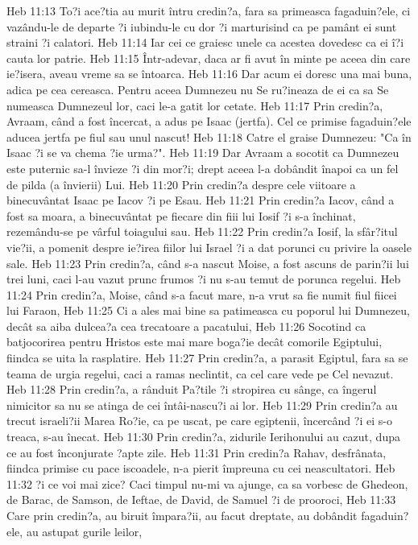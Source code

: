 Heb 11:13  To?i ace?tia au murit întru credin?a, fara sa primeasca fagaduin?ele, ci vazându-le de departe ?i iubindu-le cu dor ?i marturisind ca pe pamânt ei sunt straini ?i calatori.
Heb 11:14  Iar cei ce graiesc unele ca acestea dovedesc ca ei î?i cauta lor patrie.
Heb 11:15  Într-adevar, daca ar fi avut în minte pe aceea din care ie?isera, aveau vreme sa se întoarca.
Heb 11:16  Dar acum ei doresc una mai buna, adica pe cea cereasca. Pentru aceea Dumnezeu nu Se ru?ineaza de ei ca sa Se numeasca Dumnezeul lor, caci le-a gatit lor cetate.
Heb 11:17  Prin credin?a, Avraam, când a fost încercat, a adus pe Isaac (jertfa). Cel ce primise fagaduin?ele aducea jertfa pe fiul sau unul nascut!
Heb 11:18  Catre el graise Dumnezeu: "Ca în Isaac ?i se va chema ?ie urma?".
Heb 11:19  Dar Avraam a socotit ca Dumnezeu este puternic sa-l învieze ?i din mor?i; drept aceea l-a dobândit înapoi ca un fel de pilda (a învierii) Lui.
Heb 11:20  Prin credin?a despre cele viitoare a binecuvântat Isaac pe Iacov ?i pe Esau.
Heb 11:21  Prin credin?a Iacov, când a fost sa moara, a binecuvântat pe fiecare din fiii lui Iosif ?i s-a închinat, rezemându-se pe vârful toiagului sau.
Heb 11:22  Prin credin?a Iosif, la sfâr?itul vie?ii, a pomenit despre ie?irea fiilor lui Israel ?i a dat porunci cu privire la oasele sale.
Heb 11:23  Prin credin?a, când s-a nascut Moise, a fost ascuns de parin?ii lui trei luni, caci l-au vazut prunc frumos ?i nu s-au temut de porunca regelui.
Heb 11:24  Prin credin?a, Moise, când s-a facut mare, n-a vrut sa fie numit fiul fiicei lui Faraon,
Heb 11:25  Ci a ales mai bine sa patimeasca cu poporul lui Dumnezeu, decât sa aiba dulcea?a cea trecatoare a pacatului,
Heb 11:26  Socotind ca batjocorirea pentru Hristos este mai mare boga?ie decât comorile Egiptului, fiindca se uita la rasplatire.
Heb 11:27  Prin credin?a, a parasit Egiptul, fara sa se teama de urgia regelui, caci a ramas neclintit, ca cel care vede pe Cel nevazut.
Heb 11:28  Prin credin?a, a rânduit Pa?tile ?i stropirea cu sânge, ca îngerul nimicitor sa nu se atinga de cei întâi-nascu?i ai lor.
Heb 11:29  Prin credin?a au trecut israeli?ii Marea Ro?ie, ca pe uscat, pe care egiptenii, încercând ?i ei s-o treaca, s-au înecat.
Heb 11:30  Prin credin?a, zidurile Ierihonului au cazut, dupa ce au fost înconjurate ?apte zile.
Heb 11:31  Prin credin?a Rahav, desfrânata, fiindca primise cu pace iscoadele, n-a pierit împreuna cu cei neascultatori.
Heb 11:32  ?i ce voi mai zice? Caci timpul nu-mi va ajunge, ca sa vorbesc de Ghedeon, de Barac, de Samson, de Ieftae, de David, de Samuel ?i de prooroci,
Heb 11:33  Care prin credin?a, au biruit împara?ii, au facut dreptate, au dobândit fagaduin?ele, au astupat gurile leilor,
